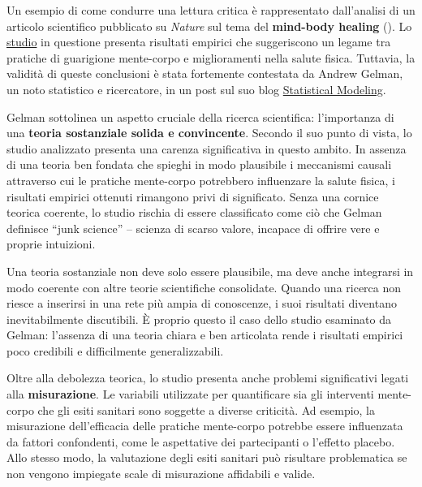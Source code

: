 \documentclass[
  letterpaper,
]{krantz}
\begin{document}

Un esempio di come condurre una lettura critica è rappresentato
dall'analisi di un articolo scientifico pubblicato su \emph{Nature} sul
tema del \textbf{mind-body healing}
(). Lo
\href{https://www.nature.com/articles/s41598-023-50009-3}{studio} in
questione presenta risultati empirici che suggeriscono un legame tra
pratiche di guarigione mente-corpo e miglioramenti nella salute fisica.
Tuttavia, la validità di queste conclusioni è stata fortemente
contestata da Andrew Gelman, un noto statistico e ricercatore, in un
post sul suo blog
\href{https://statmodeling.stat.columbia.edu/2025/01/27/does-anyone-actually-expect-meaningful-insight-to-come-from-a-study-like-this/}{Statistical
Modeling}.

Gelman sottolinea un aspetto cruciale della ricerca scientifica:
l'importanza di una \textbf{teoria sostanziale solida e convincente}.
Secondo il suo punto di vista, lo studio analizzato presenta una carenza
significativa in questo ambito. In assenza di una teoria ben fondata che
spieghi in modo plausibile i meccanismi causali attraverso cui le
pratiche mente-corpo potrebbero influenzare la salute fisica, i
risultati empirici ottenuti rimangono privi di significato. Senza una
cornice teorica coerente, lo studio rischia di essere classificato come
ciò che Gelman definisce ``junk science'' -- scienza di scarso valore,
incapace di offrire vere e proprie intuizioni.

Una teoria sostanziale non deve solo essere plausibile, ma deve anche
integrarsi in modo coerente con altre teorie scientifiche consolidate.
Quando una ricerca non riesce a inserirsi in una rete più ampia di
conoscenze, i suoi risultati diventano inevitabilmente discutibili. È
proprio questo il caso dello studio esaminato da Gelman: l'assenza di
una teoria chiara e ben articolata rende i risultati empirici poco
credibili e difficilmente generalizzabili.

Oltre alla debolezza teorica, lo studio presenta anche problemi
significativi legati alla \textbf{misurazione}. Le variabili utilizzate
per quantificare sia gli interventi mente-corpo che gli esiti sanitari
sono soggette a diverse criticità. Ad esempio, la misurazione
dell'efficacia delle pratiche mente-corpo potrebbe essere influenzata da
fattori confondenti, come le aspettative dei partecipanti o l'effetto
placebo. Allo stesso modo, la valutazione degli esiti sanitari può
risultare problematica se non vengono impiegate scale di misurazione
affidabili e valide.
\end{document}
